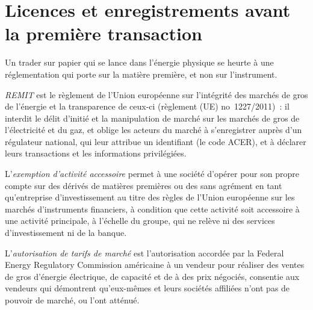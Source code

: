 \section{Licences et enregistrements avant la première transaction}

Un trader sur papier qui se lance dans l'énergie physique se heurte à une réglementation qui porte sur la matière première, et non sur
l'instrument.

\begin{definition}[REMIT]\label{def:m3:getting-access-commodities-and-power:remit}
\emph{REMIT} est le règlement de l'Union européenne sur l'intégrité des marchés de gros de l'énergie et
la transparence de ceux-ci (règlement (UE) no~1227/2011)~: il interdit le délit d'initié et la manipulation de marché
sur les marchés de gros de l'électricité et du gaz, et oblige les acteurs du marché à s'enregistrer auprès d'un régulateur national, qui
leur attribue un identifiant (le code ACER), et à déclarer leurs transactions et les informations privilégiées.
\end{definition}

\begin{definition}\label{def:m3:getting-access-commodities-and-power:aae}
L'\emph{exemption d'activité accessoire} permet à une société d'opérer pour son propre
compte sur des dérivés de matières premières ou des  sans agrément en tant qu'entreprise d'investissement au titre
des règles de l'Union européenne sur les marchés d'instruments financiers, à condition que cette activité soit accessoire à une
activité principale, à l'échelle du groupe, qui ne relève ni des services d'investissement ni de la banque.
\end{definition}

\begin{definition}\label{def:m3:getting-access-commodities-and-power:mbr}
L'\emph{autorisation de tarifs de marché} est l'autorisation accordée par la
Federal Energy Regulatory Commission américaine à un vendeur pour réaliser des ventes de gros d'énergie électrique, de capacité et
de  à des prix négociés, consentie aux vendeurs qui démontrent qu'eux-mêmes et leurs sociétés affiliées n'ont pas
de pouvoir de marché, ou l'ont atténué.
\end{definition}

